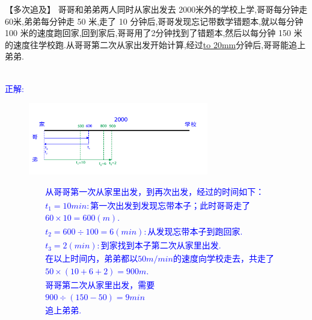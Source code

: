 \item {
    【多次追及】
    哥哥和弟弟两人同时从家出发去 2000米外的学校上学,哥哥每分钟走 60米,弟弟每分钟走 50 米,走了 10 分钟后,哥哥发现忘记带数学错题本,就以每分钟 100 米的速度跑回家,回到家后,哥哥用了2分钟找到了错题本,然后以每分钟 150 米的速度往学校跑.从哥哥第二次从家出发开始计算,经过\underline{\hbox to 20mm{}}分钟后,哥哥能追上弟弟.
    \ifshowSolution 
        \fangsong{}\textcolor{blue}{
            \\正解: \\
            \begin{figure}[H] 
                \centering
                \includegraphics[width=0.7\textwidth]{./pics/Chapter_3/seikai_2.png}
            \end{figure}
            \begin{align*}
                &从哥哥第一次从家里出发，到再次出发，经过的时间如下：\\
                &t_1=10min: 第一次出发到发现忘带本子；此时哥哥走了 \\
                &60\times 10 = 600 (m).\\
                &t_2=600\div 100 = 6(min): 从发现忘带本子到跑回家.\\
                &t_3=2(min): 到家找到本子第二次从家里出发.\\
                &在以上时间内，弟弟都以50m/min 的速度向学校走去，共走了\\
                &50\times (10+6+2) = 900 m.\\
                &哥哥第二次从家里出发，需要\\
                &900\div (150 - 50) = 9 min \\
                &追上弟弟.
            \end{align*}
        }
    \else
        \vspace{1cm}
    \fi
}


